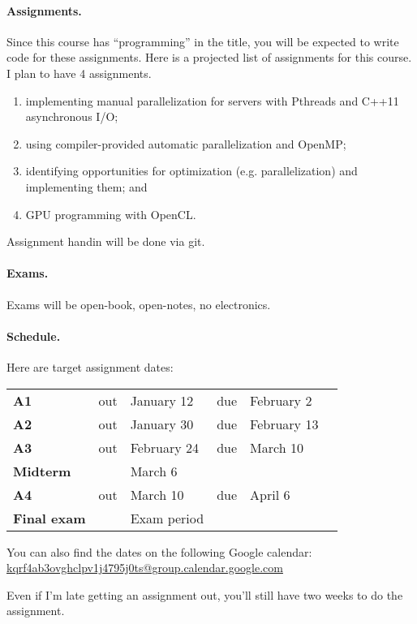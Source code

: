 \documentclass{article}
\begin{document}
\paragraph{Assignments.} Since this course has ``programming'' in the 
title, you will be expected to write code for these assignments.  Here
is a projected list of assignments for this course. I plan to have 4
assignments.
\begin{enumerate}
\item implementing manual parallelization for servers with Pthreads and C++11 asynchronous I/O;
\item using compiler-provided automatic parallelization and OpenMP;
\item identifying opportunities for optimization (e.g. parallelization) and implementing them; and
\item GPU programming with OpenCL.
\end{enumerate}
Assignment handin will be done via git.

\paragraph{Exams.} Exams will be open-book, open-notes, no electronics.

\paragraph{Schedule.} 
Here are target assignment dates:
\vspace*{.5em}

\begin{tabular}{l@{~~~}lllll}
{\bf A1} & out& January 12 & due &February 2 \\
{\bf A2} & out& January 30 & due &February 13 \\
{\bf A3} & out& February 24 & due& March 10 \\
{\bf Midterm} && March 6\\
{\bf A4} & out& March 10  & due &April 6 \\
{\bf Final exam} && Exam period
\end{tabular}

\vspace*{1em}
\noindent
You can also find the dates on the following Google calendar:\\
\hspace*{3em}\url{kqrf4ab3ovghclpv1j4795j0ts@group.calendar.google.com}

\noindent Even if I'm late getting an assignment out, you'll still have two weeks to do the assignment. 
\end{document}

